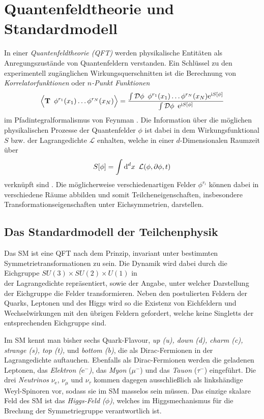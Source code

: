 \clearpage
\section{Quantenfeldtheorie und Standardmodell}
  In einer \textit{Quantenfeldtheorie (QFT)} werden physikalische Entitäten 
  als Anregungszustände von Quantenfeldern 
  verstanden. Ein Schlüssel zu den experimentell zugänglichen 
  Wirkungsquerschnitten ist die Berechnung von \textit{Korrelatorfunktionen} 
  oder \textit{$n$-Punkt Funktionen}
  \begin{equation}
   \Big\langle \textbf{T} \,\,\, \phi^{r_1}(x_1) \ldots \phi^{r_N}(x_N) 
   \Big\rangle
   =\frac{\int \mathcal{D}\phi \,\,\, \phi^{r_1}(x_1) \ldots \phi^{r_N}(x_N) 
   \text{e}^{\text{i} S[\phi]}}{\int \mathcal{D}\phi \,\,\, \text{e}^{\text{i} S[\phi]} }
   \label{renormierung:Korrelator_definition}
  \end{equation}
  im Pfadintegralformalismus von Feynman \cite{Schwartz}. Die Information über 
  die möglichen 
  physikalischen Prozesse der Quantenfelder $\phi$ 
  ist dabei in dem Wirkungsfunktional $S$ bzw. der Lagrangedichte $\mathcal{L}$ 
  enhalten, welche in einer $d$-Dimensionalen Raumzeit über 
  \begin{equation}
    S[\phi] = \int \text{d}^d x \,\,\, \mathcal{L}(\phi,\partial \phi, t) 
    \label{renormierung:Wirkung_definition}
  \end{equation}
  verknüpft sind \cite{Schwartz}. Die möglicherweise verschiedenartigen Felder  
  $\phi^{r_i}$ können dabei in verschiedene Räume abbilden und somit 
  Teilcheneigenschaften, insbesondere Transformationseigenschaften unter 
  Eichsymmetrien, darstellen. 

  \subsection{Das Standardmodell der Teilchenphysik}
    Das SM ist eine QFT nach dem Prinzip, invariant unter bestimmten 
    Symmetrietransformationen zu sein. Die Dynamik wird dabei durch die 
    Eichgruppe $SU(3)\times SU(2)\times U(1)$ in \\der Lagrangedichte 
    repräsentiert, sowie der Angabe, 
    unter welcher Darstellung der Eichgruppe die Felder transformieren. 
    Neben den postulierten Feldern der Quarks, Leptonen und des Higgs wird so 
    die Existenz von Eichfeldern und Wechselwirkungen mit den übrigen Feldern 
    gefordert, welche keine Singletts der entsprechenden Eichgruppe sind.

    Im SM kennt man bisher sechs Quark-Flavour, \textit{up (u), down (d), 
    charm (c), strange (s), top (t), }und \textit{bottom (b)}, die als 
    Dirac-Fermionen in der Lagrangedichte auftauchen. Ebenfalls als 
    Dirac-Fermionen werden die geladenen Leptonen, das \textit{Elektron 
    ($\text{e}^-$)}, das \textit{Myon} ($\mu^-$) und das \textit{Tauon} 
    ($\tau^-$) 
    eingeführt. Die drei \textit{Neutrinos} $\nu_\text{e}$, $\nu_\mu$ und 
    $\nu_\tau$ 
    kommen dagegen ausschließlich als linkshändige Weyl-Spinoren vor, sodass 
    sie im SM masselos sein müssen. Das einzige skalare Feld des SM ist 
    das \textit{Higgs-Feld ($\phi$)}, welches im Higgsmechanismus für die 
    Brechung der Symmetriegruppe verantwortlich ist.
    
